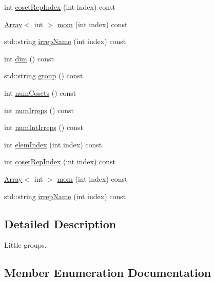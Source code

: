 \begin{DoxyCompactItemize}
\item 
int \mbox{\hyperlink{structHadron_1_1D4Group_ae7ebfa25f82987479c33f0d5d769ab2f}{coset\+Rep\+Index}} (int index) const
\item 
\mbox{\hyperlink{classXMLArray_1_1Array}{Array}}$<$ int $>$ \mbox{\hyperlink{structHadron_1_1D4Group_aeb999dc93b1a1a99ed4ffd53977a163b}{mom}} (int index) const
\item 
std\+::string \mbox{\hyperlink{structHadron_1_1D4Group_a5f121bd08a7add3ddf660c7e3478cb9e}{irrep\+Name}} (int index) const
\item 
int \mbox{\hyperlink{structHadron_1_1D4Group_a5969c3afe94d4c6ada166f7dc161a355}{dim}} () const
\item 
std\+::string \mbox{\hyperlink{structHadron_1_1D4Group_ae6c08a58023532bcf277f60c1dddde4f}{group}} () const
\item 
int \mbox{\hyperlink{structHadron_1_1D4Group_a97eed87299880400afc5e9bb1ee222bc}{num\+Cosets}} () const
\item 
int \mbox{\hyperlink{structHadron_1_1D4Group_ae8b007038fb1aa79a7267feebf356d4c}{num\+Irreps}} () const
\item 
int \mbox{\hyperlink{structHadron_1_1D4Group_a814de4e3ea523397868aee44d639c5cf}{num\+Int\+Irreps}} () const
\item 
int \mbox{\hyperlink{structHadron_1_1D4Group_aa4ca8a3f1bc6774b630cd6a354179298}{elem\+Index}} (int index) const
\item 
int \mbox{\hyperlink{structHadron_1_1D4Group_ae7ebfa25f82987479c33f0d5d769ab2f}{coset\+Rep\+Index}} (int index) const
\item 
\mbox{\hyperlink{classXMLArray_1_1Array}{Array}}$<$ int $>$ \mbox{\hyperlink{structHadron_1_1D4Group_aeb999dc93b1a1a99ed4ffd53977a163b}{mom}} (int index) const
\item 
std\+::string \mbox{\hyperlink{structHadron_1_1D4Group_a5f121bd08a7add3ddf660c7e3478cb9e}{irrep\+Name}} (int index) const
\end{DoxyCompactItemize}


\subsection{Detailed Description}
Little groups. 

\subsection{Member Enumeration Documentation}
\mbox{\label{structHadron_1_1D4Group_aebe422f0af477b78dbc12ed155d4f079}} 
